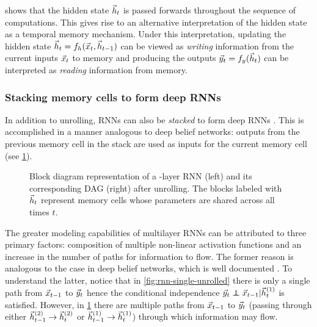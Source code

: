  shows that the hidden state $\vec{h}_t$ is passed
forwards throughout the sequence of computations. This gives rise to an
alternative interpretation of the hidden state as a temporal memory mechanism.
Under this interpretation, updating the hidden state $\vec{h}_t = f_h (\vec{x}_t,
\vec{h}_{t-1})$ can be viewed as \emph{writing} information from the current inputs
$\vec{x}_t$ to memory and producing the outputs $\vec{y}_t = f_y (\vec{h}_t)$ can be
interpreted as \emph{reading} information from memory.

\subsubsection{Stacking memory cells to form deep RNNs}

In addition to unrolling, RNNs can also be \emph{stacked} to form deep RNNs
\citep{el1995hierarchical,schmidhuber1992learning}. This is accomplished in a
manner analogous to deep belief networks: outputs from the previous memory cell
in the stack are used as inputs for the current memory cell (see
\cref{fig:rnn-multi-unrolled}).

\begin{figure}[tb]
    \centering
    \resizebox{4.5in}{!}{}
    \caption{Block diagram representation of a -layer RNN (left) and its
    corresponding DAG (right) after unrolling. The blocks labeled
    with $\vec{h}_t$ represent memory cells whose parameters are shared across all times
  $t$.}
    \label{fig:rnn-multi-unrolled}
\end{figure}

The greater modeling capabilities of multilayer RNNs can be attributed to three
primary factors: composition of multiple non-linear activation functions and an
increase in the number of paths for information to flow. The former reason is
analogous to the case in deep belief networks, which is well documented
\citep{bengio2009learning}. To understand the latter, notice that in
\cref{fig:rnn-single-unrolled} there is only a single path from $\vec{x}_{t-1}$ to
$\vec{y}_{t}$ hence the conditional independence $\y_{t} \independent \x_{t-1} |
\h^{(1)}_t$ is satisfied. However, in \cref{fig:rnn-multi-unrolled} there are
multiple paths from $\vec{x}_{t-1}$ to $\vec{y}_{t}$ (\eg passing through either
$\vec{h}^{(2)}_{t-1} \to \vec{h}^{(2)}_t$ or $\vec{h}^{(1)}_{t-1} \to \vec{h}^{(1)}_t$) through
which information may flow.


